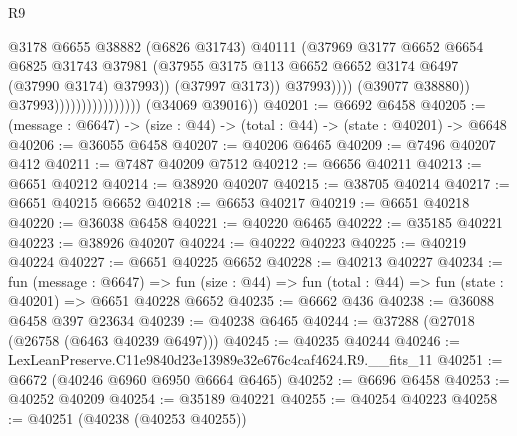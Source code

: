 \begin{lexlean}{R9}
\begin{coremodule}
                                                  @3178
                                                  @6655
                                                  @38882
                                                  (@6826 @31743)
                                                  @40111
                                                  (@37969
                                                    @3177
                                                    @6652
                                                    @6654
                                                    @6825
                                                    @31743
                                                    @37981
                                                    (@37955
                                                      @3175
                                                      @113
                                                      @6652
                                                      @6652
                                                      @3174
                                                      @6497
                                                      (@37990 @3174)
                                                      @37993))
                                                  (@37997 @3173))
                                                @37993))))
                                        (@39077 @38880))
                                      @37993))))))))))))))))
      (@34069 @39016))
@40201 := @6692 @6458
@40205 := (message : @6647) -> (size : @44) -> (total : @44) -> (state : @40201) -> @6648
@40206 := @36055 @6458
@40207 := @40206 @6465
@40209 := @7496 @40207 @412
@40211 := @7487 @40209 @7512
@40212 := @6656 @40211
@40213 := @6651 @40212
@40214 := @38920 @40207
@40215 := @38705 @40214
@40217 := @6651 @40215 @6652
@40218 := @6653 @40217
@40219 := @6651 @40218
@40220 := @36038 @6458
@40221 := @40220 @6465
@40222 := @35185 @40221
@40223 := @38926 @40207
@40224 := @40222 @40223
@40225 := @40219 @40224
@40227 := @6651 @40225 @6652
@40228 := @40213 @40227
@40234 := fun (message : @6647) =>
  fun (size : @44) => fun (total : @44) => fun (state : @40201) => @6651 @40228 @6652
@40235 := @6662 @436
@40238 := @36088 @6458 @397 @23634
@40239 := @40238 @6465
@40244 := @37288 (@27018 (@26758 (@6463 @40239 @6497)))
@40245 := @40235 @40244
@40246 := LexLeanPreserve.C11e9840d23e13989e32e676c4caf4624.R9.__fits_11
@40251 := @6672 (@40246 @6960 @6950 @6664 @6465)
@40252 := @6696 @6458
@40253 := @40252 @40209
@40254 := @35189 @40221
@40255 := @40254 @40223
@40258 := @40251 (@40238 (@40253 @40255))

\end{coremodule}
\end{lexlean}
